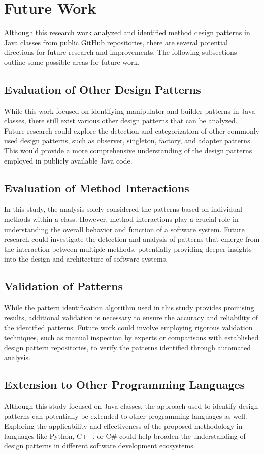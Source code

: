 \documentclass[draft]{article}
\begin{document}
\newpage
\section{Future Work}
Although this research work analyzed and identified method design patterns in Java classes from public GitHub repositories, there are several potential directions for future research and improvements. The following subsections outline some possible areas for future work.
\subsection{Evaluation of Other Design Patterns}
While this work focused on identifying manipulator and builder patterns in Java classes, there still exist various other design patterns that can be analyzed. Future research could explore the detection and categorization of other commonly used design patterns, such as observer, singleton, factory, and adapter patterns. This would provide a more comprehensive understanding of the design patterns employed in publicly available Java code.
\subsection{Evaluation of Method Interactions}
In this study, the analysis solely considered the patterns based on individual methods within a class. However, method interactions play a crucial role in understanding the overall behavior and function of a software system. Future research could investigate the detection and analysis of patterns that emerge from the interaction between multiple methods, potentially providing deeper insights into the design and architecture of software systems.
\subsection{Validation of Patterns}
While the pattern identification algorithm used in this study provides promising results, additional validation is necessary to ensure the accuracy and reliability of the identified patterns. Future work could involve employing rigorous validation techniques, such as manual inspection by experts or comparisons with established design pattern repositories, to verify the patterns identified through automated analysis.
\subsection{Extension to Other Programming Languages}
Although this study focused on Java classes, the approach used to identify design patterns can potentially be extended to other programming languages as well. Exploring the applicability and effectiveness of the proposed methodology in languages like Python, C++, or C\# could help broaden the understanding of design patterns in different software development ecosystems.
\end{document}
